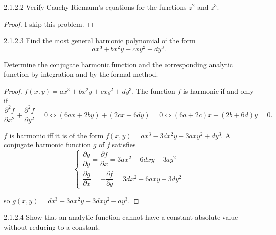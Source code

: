\begin{problem}{2.1.2.2}
Verify Cauchy-Riemann's equations for the functions \( z^{2} \) and \( z^{3} \).
\end{problem}

\begin{proof}
	I skip this problem.
\end{proof}

\begin{problem}{2.1.2.3}
Find the most general harmonic polynomial of the form
\[
	ax^{3} + bx^{2}y + cxy^{2} + dy^{3}.
\]

Determine the conjugate harmonic function and the corresponding analytic function by integration and by the formal method.
\end{problem}

\begin{proof}
	\( f(x, y) = ax^{3} + bx^{2}y + cxy^{2} + dy^{3} \). The function \( f \) is harmonic if and only if
	\[
		\dfrac{\partial^{2}f}{\partial x^{2}} + \dfrac{\partial^{2}f}{\partial y^{2}} = 0 \iff (6ax + 2by) + (2cx + 6dy) = 0 \iff (6a + 2c)x + (2b + 6d)y = 0.
	\]

	\( f \) is harmonic iff it is of the form \( f(x, y) = ax^{3} - 3dx^{2}y - 3axy^{2} + dy^{3} \). A conjugate harmonic function \( g \) of \( f \) satisfies
	\[
		\begin{cases}
			\dfrac{\partial g}{\partial y} = \dfrac{\partial f}{\partial x} = 3ax^{2} - 6dxy - 3ay^{2} \\
			\dfrac{\partial g}{\partial x} = -\dfrac{\partial f}{\partial y} = 3dx^{2} + 6axy - 3dy^{2}
		\end{cases}
	\]

	so \( g(x, y) = dx^{3} + 3ax^{2}y - 3dxy^{2} - ay^{3} \).
\end{proof}

\begin{problem}{2.1.2.4}
Show that an analytic function cannot have a constant absolute value without reducing to a constant.
\end{problem}

